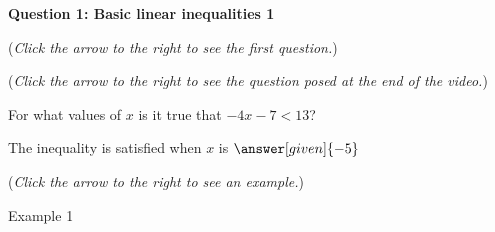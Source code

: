 \documentclass{ximera}
\begin{document}
\textbf{Question 1: Basic linear inequalities 1}
\begin{question}
\begin{flushright}
{\color{blue}(\emph{Click the arrow to the right to see the first question.})}
\end{flushright}
\begin{expandable}
\begin{center}
\end{center}
\begin{flushright}
{\color{blue}(\emph{Click the arrow to the right to see the question
posed at the end of the video.})}
\end{flushright}
\begin{expandable}
\begin{center}
For what values of $x$ is it true that $-4x-7 <13$?\\
\end{center}
\begin{prompt}
\begin{center}
The inequality is satisfied when $x$ is  $\answer[given]{-5}$\\
\end{center}
\end{prompt}
\begin{flushright}
{\color{blue}(\emph{Click the arrow to the right to see an example.})}
\end{flushright}
\begin{expandable}
\begin{center}
\begin{center}
Example 1
\end{center}
\end{center}
\end{expandable}
\end{expandable}
\end{expandable}
\end{question}
\end{document}
